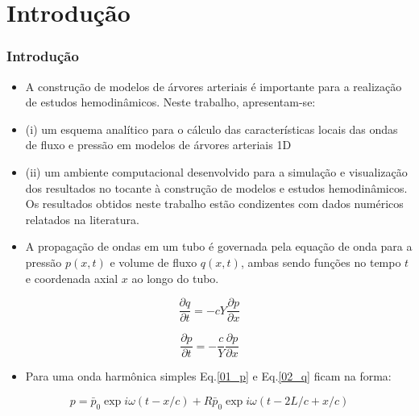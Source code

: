 \documentclass[10pt,aspectratio=169]{beamer}
\theoremstyle{remark}
\theoremstyle{definition}
\begin{document}
	\section{Introdução}
	\begin{frame}[allowframebreaks]
		\frametitle{Introdução}
		
		\begin{itemize}
			\item A construção de modelos de árvores arteriais é importante para a realização de estudos hemodinâmicos. Neste trabalho, apresentam-se: 
			\item (i) um esquema analítico para o cálculo das características locais das ondas de fluxo e pressão em modelos de árvores arteriais 1D 
			\item (ii) um ambiente computacional desenvolvido para a simulação e visualização dos resultados no tocante à construção de modelos e estudos hemodinâmicos. Os resultados obtidos neste trabalho estão condizentes com dados numéricos relatados na literatura.
			
		\end{itemize}
		
		\framebreak
		
		\begin{itemize}
			\item A propagação de ondas em um tubo é governada pela equação de onda para a pressão $p(x,t)$ e volume de fluxo $q(x,t)$, ambas sendo funções no tempo $t$ e coordenada axial $x$ ao longo do tubo.
		\end{itemize}
		

		\begin{equation}
		\frac{\partial q}{\partial t} = -cY \frac{\partial p}{\partial x}  
		\label{01_p}
		\end{equation}
		
		\begin{equation}
		\frac{\partial p}{\partial t} = -\frac{c}{Y} \frac{\partial p}{\partial x}  
		\label{02_q}
		\end{equation}
		
		\framebreak
		\begin{itemize}
			\item Para uma onda harmônica simples Eq.\ref{01_p} e Eq.\ref{02_q} ficam na forma:
		\end{itemize}
		

		\begin{equation}
		p = \bar{p}_0 \exp{i\omega(t - x/c)} + R  \bar{p}_0 \exp{i\omega(t - 2L/c + x/c)}
		\label{03_p}
		\end{equation}
		

\end{frame}
\end{document}
